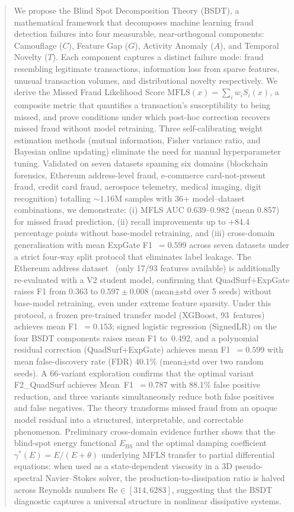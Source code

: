 \documentclass[journal]{IEEEtran}
\newcommand{\MFLS}{\mathrm{MFLS}}
\begin{document}
\begin{abstract}
We propose the Blind Spot Decomposition Theory (BSDT), a mathematical framework that decomposes machine learning fraud detection failures into four measurable, near-orthogonal components: Camouflage ($C$), Feature Gap ($G$), Activity Anomaly ($A$), and Temporal Novelty ($T$). Each component captures a distinct failure mode: fraud resembling legitimate transactions, information loss from sparse features, unusual transaction volumes, and distributional novelty respectively. We derive the Missed Fraud Likelihood Score $\MFLS(x) = \sum_i w_i S_i(x)$, a composite metric that quantifies a transaction's susceptibility to being missed, and prove conditions under which post-hoc correction recovers missed fraud without model retraining. Three self-calibrating weight estimation methods (mutual information, Fisher variance ratio, and Bayesian online updating) eliminate the need for manual hyperparameter tuning. Validated on seven datasets spanning six domains (blockchain forensics, Ethereum address-level fraud, e-commerce card-not-present fraud, credit card fraud, aerospace telemetry, medical imaging, digit recognition) totalling ${\sim}1.16$M samples with 36+ model--dataset combinations, we demonstrate: (i) MFLS AUC 0.639--0.982 (mean 0.857) for missed fraud prediction, (ii) recall improvements up to +84.4 percentage points without base-model retraining, and (iii) cross-domain generalisation with mean ExpGate F1~$= 0.599$ across seven datasets under a strict four-way split protocol that eliminates label leakage. The Ethereum address dataset~\cite{musayev2022ethfraud} (only 17/93 features available) is additionally re-evaluated with a V2 student model, confirming that QuadSurf+ExpGate raises F1 from 0.363 to $0.597{\pm}0.008$ (mean$\pm$std over 5 seeds) without base-model retraining, even under extreme feature sparsity. Under this protocol, a frozen pre-trained transfer model (XGBoost, 93~features) achieves mean F1~$= 0.153$; signed logistic regression (SignedLR) on the four BSDT components raises mean F1 to~0.492, and a polynomial residual correction (QuadSurf+ExpGate) achieves mean F1~$= 0.599$ with mean false-discovery rate (FDR) 40.1\% (mean$\pm$std over two random seeds). A 66-variant exploration confirms that the optimal variant F2\_QuadSurf achieves Mean~F1~$= 0.787$ with 88.1\% false positive reduction, and three variants simultaneously reduce both false positives and false negatives. The theory transforms missed fraud from an opaque model residual into a structured, interpretable, and correctable phenomenon. Preliminary cross-domain evidence further shows that the blind-spot energy functional $E_{\mathrm{BS}}$ and the optimal damping coefficient $\gamma^*(E) = E/(E+\theta)$ underlying MFLS transfer to partial differential equations: when used as a state-dependent viscosity in a 3D pseudo-spectral Navier--Stokes solver, the production-to-dissipation ratio is halved across Reynolds numbers $\mathrm{Re} \in [314, 6283]$, suggesting that the BSDT diagnostic captures a universal structure in nonlinear dissipative systems.
\end{abstract}
\end{document}
